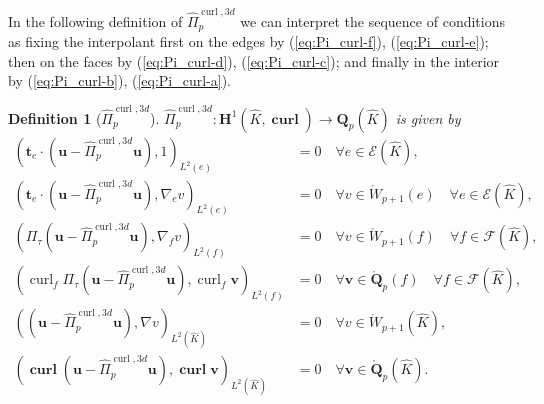 \documentclass{article}
\newtheorem{definition}[theorem]{Definition}
\newcommand{\hatPicurlcom}{\widehat \Pi^{\operatorname*{curl},3d}_p}
\begin{document}
In the following definition of $\hatPicurlcom$ we can interpret the sequence of conditions 
as fixing 
the interpolant first on the edges by (\ref{eq:Pi_curl-f}), (\ref{eq:Pi_curl-e}); 
then on the faces by (\ref{eq:Pi_curl-d}), (\ref{eq:Pi_curl-c}); 
and finally in the interior by (\ref{eq:Pi_curl-b}), (\ref{eq:Pi_curl-a}). 
\begin{definition}[$\hatPicurlcom$]
\label{def:hatPicurlcom}
$\hatPicurlcom:\mathbf{H}%
^{1}(\widehat{K},\operatorname*{\mathbf{curl}})\rightarrow\mathbf{Q}_{p}(\widehat{K})$
is given by
%
\begin{subequations}
\label{eq:Pi_curl}
\begin{align}
({\mathbf{t}}_{e}\cdot(\mathbf{u}-\hatPicurlcom\mathbf{u}),1)_{L^{2}(e)}  &  =0\quad\forall e\in{\mathcal{E}}%
(\widehat{K}), 
\label{eq:Pi_curl-f}\\
(\mathbf{t}_{e}\cdot(\mathbf{u}-\hatPicurlcom\mathbf{u}),\nabla_{e}v)_{L^{2}(e)}  &  =0\quad\forall v\in\mathring
{W}_{p+1}(e)\quad\forall e\in{\mathcal{E}}(\widehat{K}),
\label{eq:Pi_curl-e}\\
(\Pi_{\tau}(\mathbf{u}-\hatPicurlcom\mathbf{u}),\nabla_{f}v)_{L^{2}(f)}  &  =0\quad\forall v\in\mathring{W}%
_{p+1}(f)\quad\forall f\in{\mathcal{F}}(\widehat{K}),
\label{eq:Pi_curl-d}\\
(\operatorname{curl}_{f}\Pi_{\tau}(\mathbf{u}-\hatPicurlcom\mathbf{u}),\operatorname{curl}_{f}\mathbf{v}%
)_{L^{2}(f)}  &  =0\quad\forall\mathbf{v}\in\mathring{\mathbf{Q}}%
_{p}(f)\quad\forall f\in{\mathcal{F}}(\widehat{K}),
\label{eq:Pi_curl-c}\\
((\mathbf{u}-\hatPicurlcom\mathbf{u}),\nabla
v)_{L^{2}(\widehat{K})}  &  =0\quad\forall v\in\mathring{W}_{p+1}(\widehat{K}),
\label{eq:Pi_curl-b}\\
(\operatorname*{\mathbf{curl}}(\mathbf{u}-\hatPicurlcom \mathbf{u}),\operatorname*{\mathbf{curl}}\mathbf{v})_{L^{2}(\widehat{K})}  &  =0\quad
\forall\mathbf{v}\in\mathring{\mathbf{Q}}_{p}(\widehat{K}).
\label{eq:Pi_curl-a}
\end{align}
\end{subequations}
\end{definition}
\end{document}
